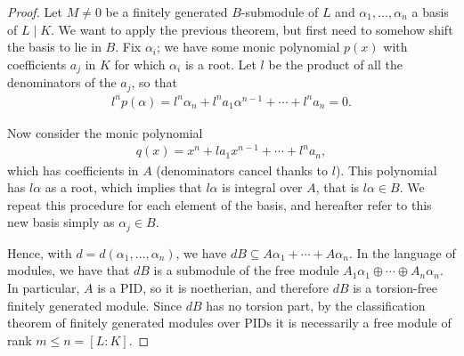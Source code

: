 \begin{proof}
	Let $M\neq 0$ be a finitely generated $B$-submodule of $L$ and $\alpha_1,\dots,\alpha_n$ a basis of $L\mid K$. We want to apply the previous theorem, but first need to somehow shift the basis to lie in $B$. Fix $\alpha_i$; we have some monic polynomial $p(x)$ with coefficients $a_j$ in $K$ for which $\alpha_i$ is a root. Let $l$ be the product of all the denominators of the $a_j$, so that
	\begin{align*}
		l^n p(\alpha) = l^n \alpha_n + l^n a_1 \alpha^{n-1} + \cdots + l^n a_n = 0.
	\end{align*}

	Now consider the monic polynomial
	\begin{align*}
		q(x) = x^n + l a_1 x^{n-1} + \cdots + l^n a_n,
	\end{align*}
	which has coefficients in $A$ (denominators cancel thanks to $l$). This polynomial has $l\alpha$ as a root, which implies that $l\alpha$ is integral over $A$, that is $l\alpha\in B$. We repeat this procedure for each element of the basis, and hereafter refer to this new basis simply as $\alpha_j\in B$.

	Hence, with $d=d(\alpha_1,\dots,\alpha_n)$, we have $dB\subseteq A\alpha_1+\cdots+A\alpha_n$. In the language of modules, we have that $dB$ is a submodule of the free module $A_1\alpha_1\oplus\cdots\oplus A_n\alpha_n$. In particular, $A$ is a PID, so it is noetherian, and therefore $dB$ is a torsion-free finitely generated module. Since $dB$ has no torsion part, by the classification theorem of finitely generated modules over PIDs it is necessarily a free module of rank $m \leq n = [L:K]$.


\end{proof}
